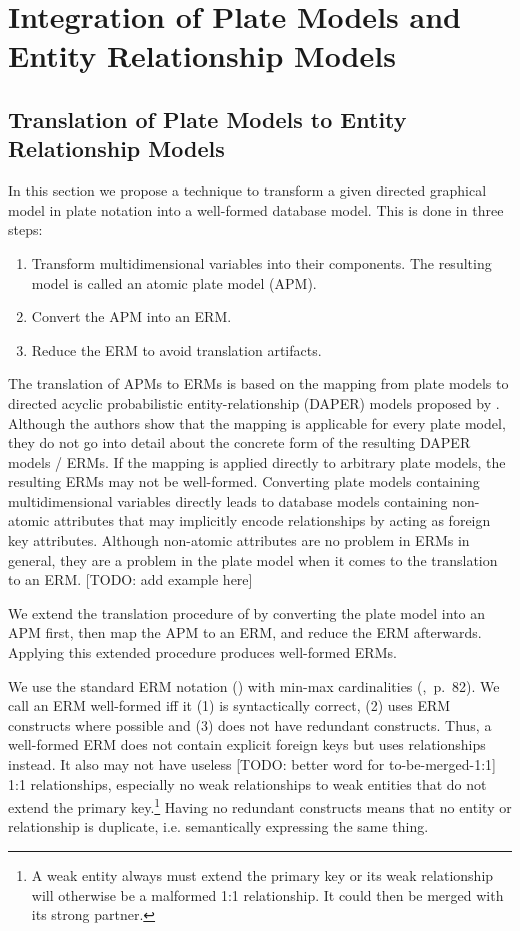 \section{Integration of Plate Models and Entity Relationship Models}

\subsection{Translation of Plate Models to Entity Relationship Models}
\label{sec:pm2erm}

In this section we propose a technique to transform a given directed graphical model in plate notation into a well-formed database model. This is done in three steps:
\begin{enumerate}
\item Transform multidimensional variables into their components. The resulting model is called an atomic plate model (APM).
\item\label{itm:apm2erm} Convert the APM into an ERM.
\item Reduce the ERM to avoid translation artifacts.
\end{enumerate}
The translation of APMs to ERMs is based on the mapping from plate models to directed acyclic probabilistic entity-relationship (DAPER) models proposed by \textcite{heckerman2007probabilistic}. Although the authors show that the mapping is applicable for every plate model, they do not go into detail about the concrete form of the resulting DAPER models / ERMs. If the mapping is applied directly to arbitrary plate models, the resulting ERMs may not be well-formed. Converting plate models containing multidimensional variables directly leads to database models containing non-atomic attributes that may implicitly encode relationships by acting as foreign key attributes. Although non-atomic attributes are no problem in ERMs in general, they are a problem in the plate model when it comes to the translation to an ERM. [TODO: add example here]

We extend the translation procedure of \textcite{heckerman2007probabilistic} by converting the plate model into an APM first, then map the APM to an ERM, and reduce the ERM afterwards. Applying this extended procedure produces well-formed ERMs.

We use the standard ERM notation (\cite{chen1976entity}) with min-max cardinalities (\cite{elmasri2007database},~p.~82). We call an ERM well-formed iff it (1) is syntactically correct, (2) uses ERM constructs where possible and (3) does not have redundant constructs. Thus, a well-formed ERM does not contain explicit foreign keys but uses relationships instead. It also may not have useless [TODO: better word for to-be-merged-1:1] 1:1 relationships, especially no weak relationships to weak entities that do not extend the primary key.\footnote{A weak entity always must extend the primary key or its weak relationship will otherwise be a malformed 1:1 relationship. It could then be merged with its strong partner.} Having no redundant constructs means that no entity or relationship is duplicate, i.e. semantically expressing the same thing.

